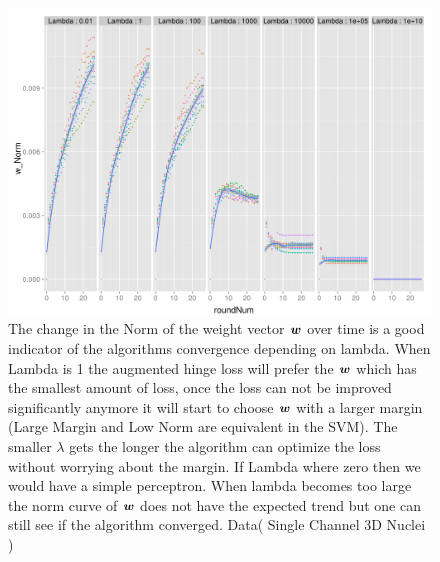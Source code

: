 \begin{figure}
  \centering
  \includegraphics[width=1.0\textwidth]{images/wNorm_nuclei_equalScale.png}
  \caption{ The change in the Norm of the weight vector $\bm{w}$ over time is a good indicator of the algorithms convergence depending on lambda. When Lambda is 1 the augmented hinge loss will prefer the $\bm{w}$ which has the smallest amount of loss, once the loss can not be improved significantly anymore it will start to choose $\bm{w}$ with a larger margin (Large Margin and Low Norm are equivalent in the SVM). The smaller $\lambda$ gets the longer the algorithm can optimize the loss without worrying about the margin. If Lambda where zero then we would have a simple perceptron. When lambda becomes too large the norm curve of $\bm{w}$ does not have the expected trend but one can still see if the algorithm converged. Data( Single Channel 3D Nuclei \cite{ucsbData}) } 
  \label{fig:lambdaWnormNucl1}
\end{figure}

